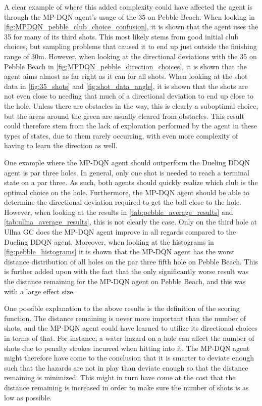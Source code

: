 \documentclass{kththesis}
\begin{document}
A clear example of where this added complexity could have affected the agent is through the MP-DQN agent's usage of the 35 on Pebble Beach. When looking in \autoref{fig:MPDQN_pebble_club_choice_confusion}, it is shown that the agent uses the 35 for many of its third shots. This most likely stems from good initial club choices, but sampling problems that caused it to end up just outside the finishing range of 30m. However, when looking at the directional deviations with the 35 on Pebble Beach in \autoref{fig:MPDQN_pebble_direction_choices}, it is shown that the agent aims almost as far right as it can for all shots. When looking at the shot data in \autoref{fig:35_shots} and \autoref{fig:shot_data_angle}, it is shown that the shots are not even close to needing that much of a directional deviation to end up close to the hole. Unless there are obstacles in the way, this is clearly a suboptimal choice, but the areas around the green are usually cleared from obstacles. This result could therefore stem from the lack of exploration performed by the agent in these types of states, due to them rarely occurring, with even more complexity of having to learn the direction as well. 

One example where the MP-DQN agent should outperform the Dueling DDQN agent is par three holes. In general, only one shot is needed to reach a terminal state on a par three. As such, both agents should quickly realize which club is the optimal choice on the hole. Furthermore, the MP-DQN agent should be able to determine the directional deviation required to get the ball close to the hole. However, when looking at the results in \autoref{tab:pebble_average_results} and \autoref{tab:ullna_average_results}, this is not clearly the case. Only on the third hole at Ullna GC does the MP-DQN agent improve in all regards compared to the Dueling DDQN agent. Moreover, when looking at the histograms in \autoref{fig:pebble_histograms} it is shown that the MP-DQN agent has the worst distance distribution of all holes on the par three fifth hole on Pebble Beach. This is further added upon with the fact that the only significantly worse result was the distance remaining for the MP-DQN agent on Pebble Beach, and this was with a large effect size. 

One possible explanation to the above results is the definition of the scoring function. The distance remaining is never more important than the number of shots, and the MP-DQN agent could have learned to utilize its directional choices in terms of that. For instance, a water hazard on a hole can affect the number of shots due to penalty strokes incurred when hitting into it. The MP-DQN agent might therefore have come to the conclusion that it is smarter to deviate enough such that the hazards are not in play than deviate enough so that the distance remaining is minimized. This might in turn have come at the cost that the distance remaining is increased in order to make sure the number of shots is as low as possible. 
\end{document}
